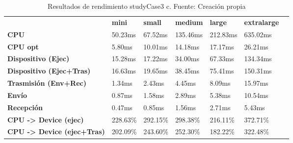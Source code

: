 \begin{table}[H]
    \centering
    \begin{tabular}{lllllll}
    \rowcolor[HTML]{DAE8FC} \ &  \textbf{mini} &  \textbf{small} &  \textbf{medium} &  \textbf{	large} &  \textbf{	extralarge} \\
    \cellcolor[HTML]{DAE8FC} \textbf{CPU} & 50.23ms & 67.52ms & 135.46ms & 	212.83ms & 	635.02ms \\
    \rowcolor[HTML]{EFEFEF} \cellcolor[HTML]{DAE8FC} \textbf{CPU opt} & 5.80ms & 10.01ms & 14.18ms & 	17.17ms & 	26.21ms \\
    \cellcolor[HTML]{DAE8FC} \textbf{Dispositivo (Ejec)} & 15.28ms & 17.22ms & 34.00ms & 	67.33ms & 	134.34ms \\
    \rowcolor[HTML]{EFEFEF} \cellcolor[HTML]{DAE8FC} \textbf{Dispositivo (Ejec+Tras)} & 16.63ms & 19.65ms & 38.45ms & 	75.41ms & 	150.31ms \\
    \cellcolor[HTML]{DAE8FC} \textbf{Trasmisión (Env+Rec)} & 1.34ms & 2.43ms & 4.45ms & 	8.09ms & 	15.97ms \\
    \rowcolor[HTML]{EFEFEF} \cellcolor[HTML]{DAE8FC} \textbf{Envío} & 0.87ms & 1.58ms & 2.89ms & 	5.38ms & 	10.54ms \\
    \cellcolor[HTML]{DAE8FC} \textbf{Recepción} & 0.47ms & 0.85ms & 1.56ms & 	2.71ms & 	5.43ms \\
    \rowcolor[HTML]{EFEFEF} \cellcolor[HTML]{DAE8FC} \textbf{CPU -> Device (ejec)} & 228.63\% & 292.15\% & 298.38\% & 	216.11\% & 	372.71\% \\
    \cellcolor[HTML]{DAE8FC} \textbf{CPU -> Device (ejec+Tras)} & 202.09\% & 243.60\% & 252.30\% & 	182.22\% & 	322.48\% \\
    \end{tabular}
    \caption[Resultados de rendimiento studyCase3 c]{{Resultados de rendimiento studyCase3 c. Fuente: Creación propia}}
    \label{table_test_studyCase3_c_hw_performanceResults}
\end{table}